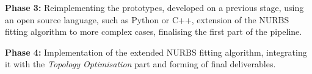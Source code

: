 \textbf{Phase 3:} Reimplementing the prototypes, developed on a previous stage, using an open source language, such as Python or C++, extension of the NURBS fitting algorithm to more complex cases, finalising the first part of the pipeline.

\textbf{Phase 4:} Implementation of the extended NURBS fitting algorithm, integrating it with the \textit{Topology Optimisation} part and forming of final deliverables.

